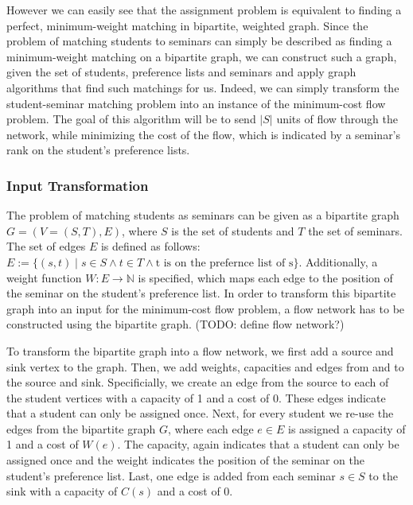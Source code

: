 However we can easily see that the assignment problem is equivalent to finding a perfect, minimum-weight matching in bipartite, weighted graph. Since the problem of matching students to seminars can simply be described as finding a minimum-weight matching on a bipartite graph, we can construct such a graph, given the set of students, preference lists and seminars and apply graph algorithms that find such matchings for us. Indeed, we can simply transform the student-seminar matching problem into an instance of the minimum-cost flow problem. The goal of this algorithm will be to send $|S|$ units of flow through the network, while minimizing the cost of the flow, which is indicated by a seminar's rank on the student's preference lists.

\subsubsection{Input Transformation}
The problem of matching students as seminars can be given as a bipartite graph $G=(V=(S, T), E)$, where $S$ is the set of students and $T$ the set of seminars. The set of edges $E$ is defined as follows: $E:= \{(s, t) \mid s \in S \land t \in T \land \mbox{t is on the prefernce list of s}\}$. Additionally, a weight function $W: E \rightarrow  \mathbb{N}$ is specified, which maps each edge to the position of the seminar on the student's preference list. In order to transform this bipartite graph into an input for the minimum-cost flow problem, a flow network has to be constructed using the bipartite graph. (TODO: define flow network?) 

To transform the bipartite graph into a flow network, we first add a source and sink vertex to the graph. Then, we add weights, capacities and edges from and to the source and sink. Specificially, we create an edge from the source to each of the student vertices with a capacity of 1 and a cost of 0. These edges indicate that a student can only be assigned once. Next, for every student we re-use the edges from the bipartite graph $G$, where each edge $e \in E$ is assigned a capacity of 1 and a cost of $W(e)$. The capacity, again indicates that a student can only be assigned once and the weight indicates the position of the seminar on the student's preference list. Last, one edge is added from each seminar $s \in S$ to the sink with a capacity of $C(s)$ and a cost of 0. 

